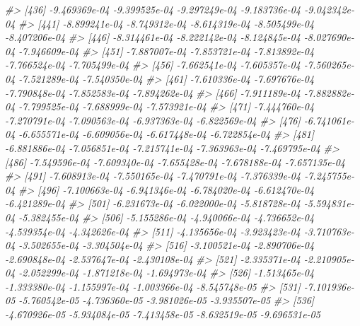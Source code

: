 \documentclass[
]{article}
\newenvironment{Shaded}{\begin{snugshade}}{\end{snugshade}}
\newcommand{\CommentTok}[1]{\textcolor[rgb]{0.56,0.35,0.01}{\textit{#1}}}
\begin{document}
\begin{Shaded}
\begin{Highlighting}[]
\CommentTok{\#\textgreater{} [436] {-}9.469369e{-}04 {-}9.399525e{-}04 {-}9.297249e{-}04 {-}9.183736e{-}04 {-}9.042342e{-}04}
\CommentTok{\#\textgreater{} [441] {-}8.899241e{-}04 {-}8.749312e{-}04 {-}8.614319e{-}04 {-}8.505499e{-}04 {-}8.407206e{-}04}
\CommentTok{\#\textgreater{} [446] {-}8.314461e{-}04 {-}8.222142e{-}04 {-}8.124845e{-}04 {-}8.027690e{-}04 {-}7.946609e{-}04}
\CommentTok{\#\textgreater{} [451] {-}7.887007e{-}04 {-}7.853721e{-}04 {-}7.813892e{-}04 {-}7.766524e{-}04 {-}7.705499e{-}04}
\CommentTok{\#\textgreater{} [456] {-}7.662541e{-}04 {-}7.605357e{-}04 {-}7.560265e{-}04 {-}7.521289e{-}04 {-}7.540350e{-}04}
\CommentTok{\#\textgreater{} [461] {-}7.610336e{-}04 {-}7.697676e{-}04 {-}7.790848e{-}04 {-}7.852583e{-}04 {-}7.894262e{-}04}
\CommentTok{\#\textgreater{} [466] {-}7.911189e{-}04 {-}7.882882e{-}04 {-}7.799525e{-}04 {-}7.688999e{-}04 {-}7.573921e{-}04}
\CommentTok{\#\textgreater{} [471] {-}7.444760e{-}04 {-}7.270791e{-}04 {-}7.090563e{-}04 {-}6.937363e{-}04 {-}6.822569e{-}04}
\CommentTok{\#\textgreater{} [476] {-}6.741061e{-}04 {-}6.655571e{-}04 {-}6.609056e{-}04 {-}6.617448e{-}04 {-}6.722854e{-}04}
\CommentTok{\#\textgreater{} [481] {-}6.881886e{-}04 {-}7.056851e{-}04 {-}7.215741e{-}04 {-}7.363963e{-}04 {-}7.469795e{-}04}
\CommentTok{\#\textgreater{} [486] {-}7.549596e{-}04 {-}7.609340e{-}04 {-}7.655428e{-}04 {-}7.678188e{-}04 {-}7.657135e{-}04}
\CommentTok{\#\textgreater{} [491] {-}7.608913e{-}04 {-}7.550165e{-}04 {-}7.470791e{-}04 {-}7.376339e{-}04 {-}7.245755e{-}04}
\CommentTok{\#\textgreater{} [496] {-}7.100663e{-}04 {-}6.941346e{-}04 {-}6.784020e{-}04 {-}6.612470e{-}04 {-}6.421289e{-}04}
\CommentTok{\#\textgreater{} [501] {-}6.231673e{-}04 {-}6.022000e{-}04 {-}5.818728e{-}04 {-}5.594831e{-}04 {-}5.382455e{-}04}
\CommentTok{\#\textgreater{} [506] {-}5.155286e{-}04 {-}4.940066e{-}04 {-}4.736652e{-}04 {-}4.539354e{-}04 {-}4.342626e{-}04}
\CommentTok{\#\textgreater{} [511] {-}4.135656e{-}04 {-}3.923423e{-}04 {-}3.710763e{-}04 {-}3.502655e{-}04 {-}3.304504e{-}04}
\CommentTok{\#\textgreater{} [516] {-}3.100521e{-}04 {-}2.890706e{-}04 {-}2.690848e{-}04 {-}2.537647e{-}04 {-}2.430108e{-}04}
\CommentTok{\#\textgreater{} [521] {-}2.335371e{-}04 {-}2.210905e{-}04 {-}2.052299e{-}04 {-}1.871218e{-}04 {-}1.694973e{-}04}
\CommentTok{\#\textgreater{} [526] {-}1.513465e{-}04 {-}1.333380e{-}04 {-}1.155997e{-}04 {-}1.003366e{-}04 {-}8.545748e{-}05}
\CommentTok{\#\textgreater{} [531] {-}7.101936e{-}05 {-}5.760542e{-}05 {-}4.736360e{-}05 {-}3.981026e{-}05 {-}3.935507e{-}05}
\CommentTok{\#\textgreater{} [536] {-}4.670926e{-}05 {-}5.934084e{-}05 {-}7.413458e{-}05 {-}8.632519e{-}05 {-}9.696531e{-}05}

\end{Highlighting}
\end{Shaded}
\end{document}

